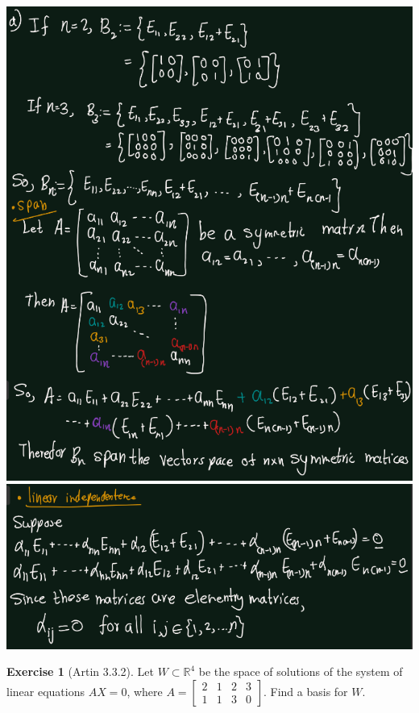 \documentclass[
]{book}
\theoremstyle{definition}
\theoremstyle{definition}
\theoremstyle{definition}
\newtheorem{exercise}{Exercise}[chapter]
\theoremstyle{definition}
\theoremstyle{remark}
\begin{document}
\includegraphics{figures/ch_3/ex-3.1-1.png}
\includegraphics{figures/ch_3/ex-3.1-2.png}

\begin{exercise}[Artin 3.3.2]
\protect\hypertarget{exr:unnamed-chunk-286}{}\label{exr:unnamed-chunk-286}Let \(W \subset \mathbb{R}^4\) be the space of solutions of the system of linear equations \(AX = 0\), where
\(A =\begin{bmatrix} 2 & 1 & 2 & 3 \\ 1 & 1 & 3 & 0 \end{bmatrix}\).
Find a basis for \(W\).
\end{exercise}
\end{document}
